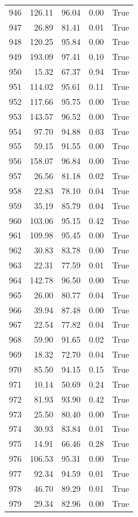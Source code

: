 \begin{longtable}{rrrrr}
946 & 126.11 & 96.04 & 0.00 & True \\
947 & 26.89 & 81.41 & 0.01 & True \\
948 & 120.25 & 95.84 & 0.00 & True \\
949 & 193.09 & 97.41 & 0.10 & True \\
950 & 15.32 & 67.37 & 0.94 & True \\
951 & 114.02 & 95.61 & 0.11 & True \\
952 & 117.66 & 95.75 & 0.00 & True \\
953 & 143.57 & 96.52 & 0.00 & True \\
954 & 97.70 & 94.88 & 0.03 & True \\
955 & 59.15 & 91.55 & 0.00 & True \\
956 & 158.07 & 96.84 & 0.00 & True \\
957 & 26.56 & 81.18 & 0.02 & True \\
958 & 22.83 & 78.10 & 0.04 & True \\
959 & 35.19 & 85.79 & 0.04 & True \\
960 & 103.06 & 95.15 & 0.42 & True \\
961 & 109.98 & 95.45 & 0.00 & True \\
962 & 30.83 & 83.78 & 0.00 & True \\
963 & 22.31 & 77.59 & 0.01 & True \\
964 & 142.78 & 96.50 & 0.00 & True \\
965 & 26.00 & 80.77 & 0.04 & True \\
966 & 39.94 & 87.48 & 0.00 & True \\
967 & 22.54 & 77.82 & 0.04 & True \\
968 & 59.90 & 91.65 & 0.02 & True \\
969 & 18.32 & 72.70 & 0.04 & True \\
970 & 85.50 & 94.15 & 0.15 & True \\
971 & 10.14 & 50.69 & 0.24 & True \\
972 & 81.93 & 93.90 & 0.42 & True \\
973 & 25.50 & 80.40 & 0.00 & True \\
974 & 30.93 & 83.84 & 0.01 & True \\
975 & 14.91 & 66.46 & 0.28 & True \\
976 & 106.53 & 95.31 & 0.00 & True \\
977 & 92.34 & 94.59 & 0.01 & True \\
978 & 46.70 & 89.29 & 0.01 & True \\
979 & 29.34 & 82.96 & 0.00 & True \\

\end{longtable}
